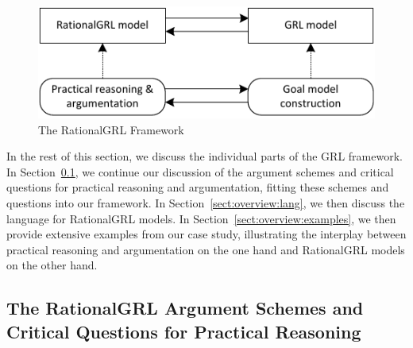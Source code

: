 \begin{figure}[b]
\centering
\includegraphics[width=\columnwidth]{img/framework.pdf}
\caption{The RationalGRL Framework}
\label{fig:rationalgrl-framework}
\end{figure}

In the rest of this section, we discuss the individual parts of the GRL framework. In Section~\ref{sect:overview:as}, we continue our discussion of the argument schemes and critical questions for practical reasoning and argumentation, fitting these schemes and questions into our framework. In Section~\ref{sect:overview:lang}, we then discuss the language for RationalGRL models. In Section~\ref{sect:overview:examples}, we then provide extensive examples from our case study, illustrating the interplay between practical reasoning and argumentation on the one hand and RationalGRL models on the other hand.  

\subsection{The RationalGRL Argument Schemes and Critical Questions for Practical Reasoning}
\label{sect:overview:as}

